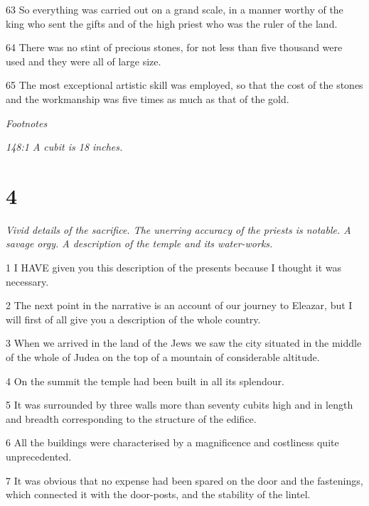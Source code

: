 \par 63 So everything was carried out on a grand scale, in a manner worthy of the king who sent the gifts and of the high priest who was the ruler of the land.

\par 64 There was no stint of precious stones, for not less than five thousand were used and they were all of large size.

\par 65 The most exceptional artistic skill was employed, so that the cost of the stones and the workmanship was five times as much as that of the gold.

\par \textit{Footnotes}

\par \textit{148:1 A cubit is 18 inches.}

\chapter{4}

\par \textit{Vivid details of the sacrifice. The unerring accuracy of the priests is notable. A savage orgy. A description of the temple and its water-works.}

\par 1 I HAVE given you this description of the presents because I thought it was necessary.

\par 2 The next point in the narrative is an account of our journey to Eleazar, but I will first of all give you a description of the whole country.

\par 3 When we arrived in the land of the Jews we saw the city situated in the middle of the whole of Judea on the top of a mountain of considerable altitude.

\par 4 On the summit the temple had been built in all its splendour.

\par 5 It was surrounded by three walls more than seventy cubits high and in length and breadth corresponding to the structure of the edifice.

\par 6 All the buildings were characterised by a magnificence and costliness quite unprecedented.

\par 7 It was obvious that no expense had been spared on the door and the fastenings, which connected it with the door-posts, and the stability of the lintel.


